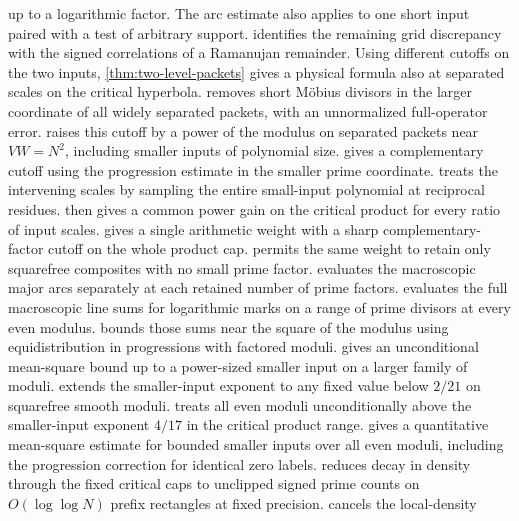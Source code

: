 \documentclass[11pt,a4paper]{article}
\numberwithin{equation}{section}
\begin{document}
up to a logarithmic factor. The arc estimate also applies to
one short input paired with a test of arbitrary support.
 identifies the remaining grid
discrepancy with the signed correlations of a Ramanujan remainder.
Using different cutoffs on the two inputs,
\cref{thm:two-level-packets} gives a physical formula also at
separated scales on the critical hyperbola.
 removes short M\"obius
divisors in the larger coordinate of all widely separated
packets, with an unnormalized full-operator error.
 raises this cutoff by a
power of the modulus on separated packets near $VW=N^2$,
including smaller inputs of polynomial size.
 gives a complementary cutoff
using the progression estimate in the smaller prime coordinate.
 treats the intervening
scales by sampling the entire small-input polynomial at reciprocal
residues.  then gives a common
power gain on the critical product for every ratio of input scales.
 gives a single arithmetic
weight with a sharp complementary-factor cutoff on the whole
product cap.
 permits the same weight to
retain only squarefree composites with no small prime factor.
 evaluates the macroscopic
major arcs separately at each retained number of prime factors.
 evaluates the full macroscopic
line sums for logarithmic marks on a range of prime divisors
at every even modulus.
 bounds those sums near the square
of the modulus using equidistribution in progressions with
factored moduli.
 gives an unconditional mean-square
bound up to a power-sized smaller input on a larger family of moduli.
 extends the smaller-input exponent
to any fixed value below $2/21$ on squarefree smooth moduli.
 treats all even moduli
unconditionally above the smaller-input exponent $4/17$ in the
critical product range.
 gives a quantitative mean-square
estimate for bounded smaller inputs over all even moduli,
including the progression correction for identical zero labels.
 reduces decay in density through
the fixed critical caps to unclipped signed prime counts on
$O(\log\log N)$ prefix rectangles at fixed precision.
 cancels the local-density
\end{document}
